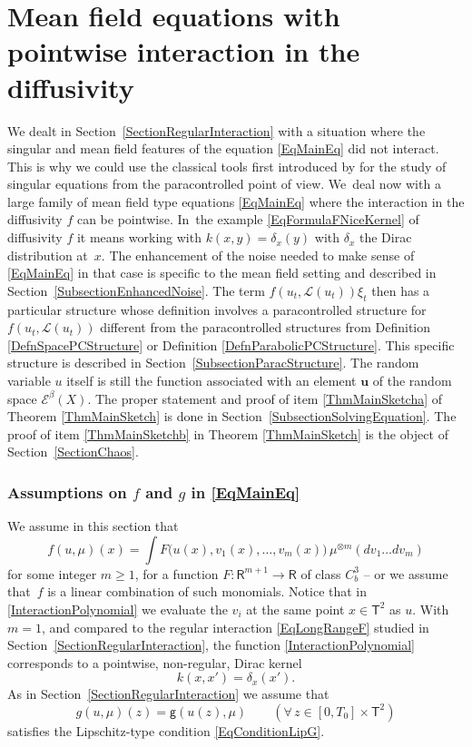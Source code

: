 \documentclass[10pt]{amsart}
\theoremstyle{definition}
\newcommand\bbR{\mathbf{\mathsf{R}}}
\newcommand{\mcE}{\mathcal{E}}
\newcommand{\mcL}{\mathcal{L}}
\newcommand{\bsu}{\boldsymbol{u}}
\begin{document}
\section{Mean field equations with pointwise interaction in the diffusivity}
\label{SectionGeneral}

We dealt in Section~\ref{SectionRegularInteraction} with a situation where the singular and mean field features of the equation \eqref{EqMainEq} did not interact. This is why we could use the classical tools first introduced by \cite{GIP} for the study of singular equations from the paracontrolled point of view. We~deal now with a large family of mean field type equations \eqref{EqMainEq} where the interaction in the diffusivity $f$ can be pointwise. In~the example \eqref{EqFormulaFNiceKernel} of diffusivity $f$ it means working with $k(x,y)=\delta_x(y)$ with $\delta_x$ the Dirac distribution at~$x$. The enhancement of the noise needed to make sense of \eqref{EqMainEq} in that case is specific to the mean field setting and described in Section~\ref{SubsectionEnhancedNoise}. The term $f(u_t,\mcL(u_t))\xi_t$ then has a particular structure whose definition involves a paracontrolled structure for $f(u_t,\mcL(u_t))$ different from the paracontrolled structures from Definition \ref{DefnSpacePCStructure} or Definition \ref{DefnParabolicPCStructure}. This specific structure is described in Section~\ref{SubsectionParacStructure}. The random variable $u$ itself is still the function associated with an element $\bsu$ of the random space $\mcE^\beta(X)$. The proper statement and proof of item \eqref{ThmMainSketcha} of Theorem \ref{ThmMainSketch} is done in Section~\ref{SubsectionSolvingEquation}. The proof of item \eqref{ThmMainSketchb} in Theorem \ref{ThmMainSketch} is the object of Section~\ref{SectionChaos}.

\subsubsection*{Assumptions on $f$ and $g$ in \eqref{EqMainEq}} We assume in this section that
\begin{equation} \label{InteractionPolynomial}
f(u,\mu)(x) = \int F\bigl(u(x), v_1(x), \dots, v_m(x)\bigr) \, \mu^{\otimes m}(dv_1\dots dv_m)
\end{equation}
for some integer $m\geq1$, for a function $F : \bbR^{m+1}\to\bbR$ of class $C^3_b$ -- or we assume that~$f$ is a linear combination of such monomials. Notice that in \eqref{InteractionPolynomial} we evaluate the $v_i$ at the same point $x\in\mathsf{T}^2$ as $u$. With $m=1$, and compared to the regular interaction \eqref{EqLongRangeF} studied in Section~\ref{SectionRegularInteraction}, the function \eqref{InteractionPolynomial} corresponds to a pointwise, non-regular, Dirac kernel
\[
k(x,x')=\delta_x(x').
\]
As in Section~\ref{SectionRegularInteraction} we assume that
\begin{equation} \label{EqStructuralAssumptionG}
g(u,\mu)(z) = \mathsf{g}(u(z),\mu) \qquad (\forall\,z\in [0,T_0]\times \mathsf{T}^2)
\end{equation}
satisfies the Lipschitz-type condition \eqref{EqConditionLipG}.
\end{document}
